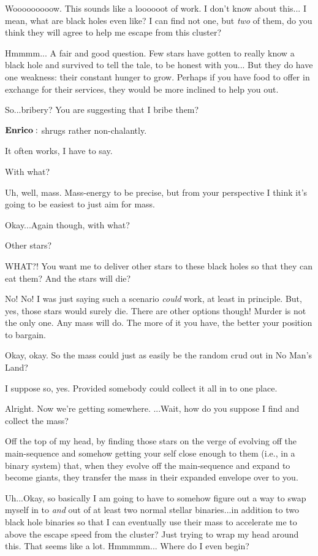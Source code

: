 \documentclass[main.tex]{subfiles}
\begin{document}
\Sterope Wooooooooow.  This sounds like a loooooot of work.  I don't know about this... I mean, what are black holes even like?   I can find not one, but \textit{two} of them, do you think they will agree to help me escape from this cluster?

\Enrico Hmmmm... A fair and good question.  Few stars have gotten to really know a black hole and survived to tell the tale, to be honest with you... But they do have one weakness:  their constant hunger to grow.  Perhaps if you have food to offer in exchange for their services, they would be more inclined to help you out.  

\Sterope  So...bribery?  You are suggesting that I bribe them?  

$\Enrico$ shrugs rather non-chalantly.

\Enrico It often works, I have to say.

\Sterope With what?

\Enrico Uh, well, mass.  Mass-energy to be precise, but from your perspective I think it's going to be easiest to just aim for mass.

\Sterope Okay...Again though, with what?

\Enrico Other stars?

\Sterope WHAT?! You want me to deliver other stars to these black holes so that they can eat them?  And the stars will die?

\Enrico No! No! I was just saying such a scenario \textit{could} work, at least in principle.  But, yes, those stars would surely die.  There are other options though!  Murder is not the only one.  Any mass will do.  The more of it you have, the better your position to bargain.

\Sterope Okay, okay. So the mass could just as easily be the random crud out in No Man's Land?

\Enrico I suppose so, yes.  Provided somebody could collect it all in to one place.

\Sterope Alright.  Now we're getting somewhere.  ...Wait, how do you suppose I find and collect the mass?

\Enrico Off the top of my head, by finding those stars on the verge of evolving off the main-sequence and somehow getting your self close enough to them (i.e., in a binary system) that, when they evolve off the main-sequence and expand to become giants, they transfer the mass in their expanded envelope over to you.

\Sterope  Uh...Okay, so basically I am going to have to somehow figure out a way to swap myself in to \textit{and} out of at least two normal stellar binaries...in addition to two black hole binaries so that I can eventually use their mass to accelerate me to above the escape speed from the cluster?  Just trying to wrap my head around this.  That seems like a lot.  Hmmmmm... Where do I even begin?
\end{document}

